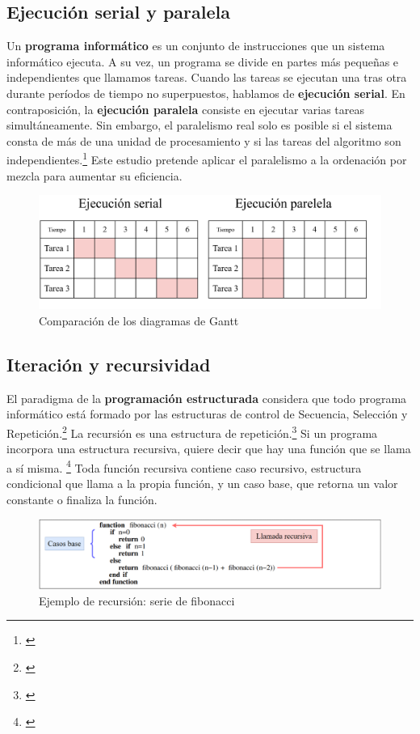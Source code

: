 \documentclass[titlepage]{article}
\begin{document}
\subsection{Ejecución serial y paralela} %
Un \textbf{programa informático} es un conjunto de instrucciones que un sistema informático ejecuta. A su vez, un programa se divide en partes más pequeñas e independientes que llamamos tareas. Cuando las tareas se ejecutan una tras otra durante períodos de tiempo no superpuestos, hablamos de \textbf{ejecución serial}. En contraposición, la \textbf{ejecución paralela} consiste en ejecutar varias tareas simultáneamente. Sin embargo, el paralelismo real solo es posible si el sistema consta de más de una unidad de procesamiento y si las tareas del algoritmo son independientes.\footnote{\cite{bobrov-2023}} Este estudio pretende aplicar el paralelismo a la ordenación por mezcla para aumentar su eficiencia.

\begin{figure}[h]
    \centering
    \captionsetup{justification=centering}
    \includegraphics[width=0.65\linewidth]{Diagrames/serialVsParallel.png}
    \caption{Comparación de los diagramas de Gantt}
    \label{fig:serialVsParallel}
\end{figure}

\subsection{Iteración y recursividad} %
El paradigma de la \textbf{programación estructurada} considera que todo programa informático está formado por las estructuras de control de Secuencia, Selección y Repetición.\footnote{\cite{extended-learning-institute-no-date}} La recursión es una estructura de repetición.\footnote{\cite{wellesley-college-2000}} Si un programa incorpora una estructura recursiva, quiere decir que hay una función que se llama a sí misma. \footnote{\cite{bhargava-2016}} Toda función recursiva contiene caso recursivo, estructura condicional que llama a la propia función, y un caso base,  que retorna un valor constante o finaliza la función.
\begin{figure}[h]
	\includegraphics[width=\textwidth]{ejemploRecursion.png}
	
	\label{fig:ejemploRecursion}
\caption{Ejemplo de recursión: serie de fibonacci}

\end{figure}
\end{document}

